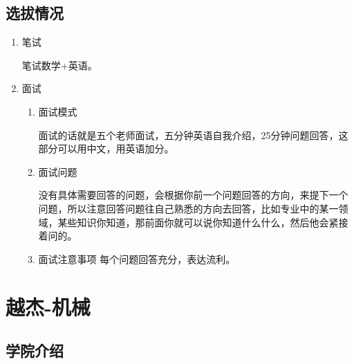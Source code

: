 \documentclass[zihao=-4,fontset=none]{Beautybook-CN}
\begin{document}
\subsection{选拔情况} 
\begin{enumerate}
	\item 笔试
 
	      笔试数学+英语。
	      	      	      
	\item 面试
	      \begin{enumerate}
	      	\item 面试模式
	      	      	      	      	      	          
	      	      面试的话就是五个老师面试，五分钟英语自我介绍，25分钟问题回答，这部分可以用中文，用英语加分。
	      	      	      	      	      	          
	      	\item 面试问题
	      	      	      	      	      	          
	      	      没有具体需要回答的问题，会根据你前一个问题回答的方向，来提下一个问题，所以注意回答问题往自己熟悉的方向去回答，比如专业中的某一领域，某些知识你知道，那前面你就可以说你知道什么什么，然后他会紧接着问的。
	      	      	      	      	      	          
	      	\item 面试注意事项
	      	      每个问题回答充分，表达流利。
	      \end{enumerate}    
\end{enumerate}
\section{越杰-机械}

\subsection{学院介绍}
\end{document}
